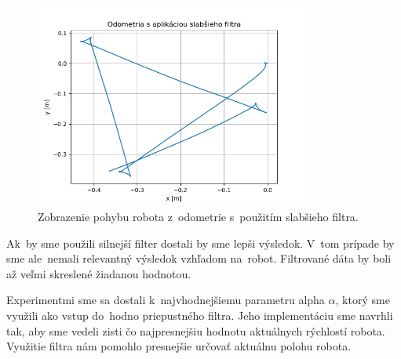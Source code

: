 \begin{figure}[!htbp]
	\begin{center}
		\includegraphics[width=0.8\textwidth]{img/stvorec_so_slabym_filtrom.png}
	\end{center}
	\caption{Zobrazenie pohybu robota z~odometrie s~použitím slabšieho filtra.}
	\label{fig:stvorecSoSlabsimFiltrom}
\end{figure}

Ak~by sme použili silnejší filter dostali by sme lepši výsledok. V~tom prípade by sme ale~nemali relevantný výsledok
vzhľadom na~robot. Filtrované dáta by boli až veľmi skreslené žiadanou hodnotou.

Experimentmi sme sa dostali k~najvhodnejšiemu parametru alpha $\alpha$, ktorý sme využili ako vstup
do~hodno priepustného filtra. Jeho implementáciu sme navrhli tak, aby sme vedeli zisti čo najpresnejšiu
hodnotu aktuálnych rýchlostí robota. Využitie filtra nám pomohlo presnejšie určovať aktuálnu polohu robota.


